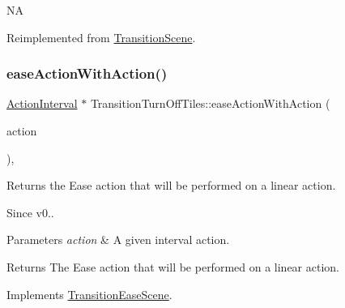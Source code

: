 NA 

Reimplemented from \hyperlink{classTransitionScene_ae3600e652909eeae3113bc39ce8ef8d1}{Transition\+Scene}.

\mbox{\label{classTransitionTurnOffTiles_ab97d4817adc0214335c27b055ef29631}} 
\subsubsection{\texorpdfstring{ease\+Action\+With\+Action()}{easeActionWithAction()}\hspace{0.1cm}{\footnotesize\ttfamily [1/2]}}
{\footnotesize\ttfamily \hyperlink{classActionInterval}{Action\+Interval} $\ast$ Transition\+Turn\+Off\+Tiles\+::ease\+Action\+With\+Action (\begin{DoxyParamCaption}\item[{\hyperlink{classActionInterval}{Action\+Interval} $\ast$}]{action }\end{DoxyParamCaption})\hspace{0.3cm}{\ttfamily [override]}, {\ttfamily [virtual]}}

Returns the Ease action that will be performed on a linear action. \begin{DoxySince}{Since}
v0..
\end{DoxySince}

\begin{DoxyParams}{Parameters}
{\em action} & A given interval action. \\
\hline
\end{DoxyParams}
\begin{DoxyReturn}{Returns}
The Ease action that will be performed on a linear action. 
\end{DoxyReturn}


Implements \hyperlink{classTransitionEaseScene_a6f27540600b0d703ed30adc8976e65df}{Transition\+Ease\+Scene}.

\mbox{\label{classTransitionTurnOffTiles_a0aa4b9097d9dce78011713c44e3cd4b8}} 
